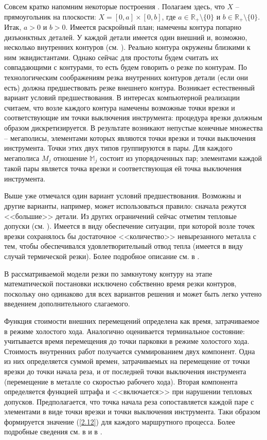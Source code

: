 \documentclass[10pt]{SPIIRAS_Proceedings}
\begin{document}
Совсем кратко напомним некоторые построения \cite[$\S$ 3.3]{4}.
Полагаем здесь, что $X$ -- прямоугольник на плоскости:
$X = [0,a] \times [0,b]$,
где $a \in \mathbb{R}_+ \setminus \{0\}$ и $b \in \mathbb{R}_+ \setminus \{0\}.$
Итак, $a > 0$ и $b > 0.$
Имеется раскройный план;
намечены контура попарно дизъюнктных деталей.
У каждой детали имеется один внешний и,
возможно,
несколько внутренних контуров
(см. \cite[\S~3.2]{4}).
Реально контура окружены близкими к ним эквидистантами.
Однако сейчас для простоты
будем считать их совпадающими с контурами,
то есть будем говорить о резке по контурам.
По технологическим соображениям
резка внутренних контуров детали
(если они есть)
должна предшествовать резке внешнего контура.
Возникает естественный вариант условий предшествования.
В интересах компьютерной реализации считаем,
что возле каждого контура намечены возможные
точки врезки и соответствующие им точки выключения инструмента:
процедура врезки должным образом дискретизируется.
В результате возникают непустые конечные множества --
мегаполисы,
элементами которых являются точки врезки
и точки выключения инструмента.
Точки этих двух типов группируются в пары.
Для каждого мегаполиса
$M_j$
отношение
$\mathbb{M}_j$
состоит из упорядоченных пар;
элементами каждой такой пары является
точка врезки
и соответствующая ей точка выключения инструмента.

Выше уже отмечался один вариант
условий предшествования.
Возможны и другие варианты,
например,
может использоваться правило:
сначала режутся <<большие>> детали.
Из других ограничений сейчас отметим
тепловые допуски
(см. \cite{18}).
Имеется в виду обеспечение ситуации,
при которой возле точек врезки сохранялось бы
достаточное <<количество>>
невырезанного металла с тем,
чтобы обеспечивался удовлетворительный отвод тепла
(имеется в виду случай термической резки).
Более подробное описание см. в \cite{18}.

В рассматриваемой модели резки
по замкнутому контуру
на этапе математической постановки исключено
собственно время резки контуров,
поскольку оно одинаково для всех вариантов решения
и может быть легко учтено введением
дополнительного слагаемого.

Функция стоимости внешних перемещений
определена как время,
затрачиваемое в режиме холостого хода.
Аналогично оценивается терминальное состояние:
учитывается время перемещения до точки парковки
в режиме холостого хода.
Стоимость внутренних работ
получается суммированием двух компонент.
Одна из них определяется суммой времен,
затрачиваемых на перемещение
от точки врезки до точки начала реза,
и от последней точки выключения инструмента
(перемещение в металле со скоростью рабочего хода).
Вторая компонента определяется функцией штрафа и
<<включается>> при нарушении тепловых допусков.
Предполагается, что точка начала реза
сопоставляется каждой паре с элементами в виде
точки врезки и точки выключения инструмента.
Таки образом
формируется значение (\ref{2.12})
для каждого маршрутного процесса.
Более подробные сведения см. в
\cite[часть 1, глава 3]{4}
и в
\cite{18}.
\end{document}
